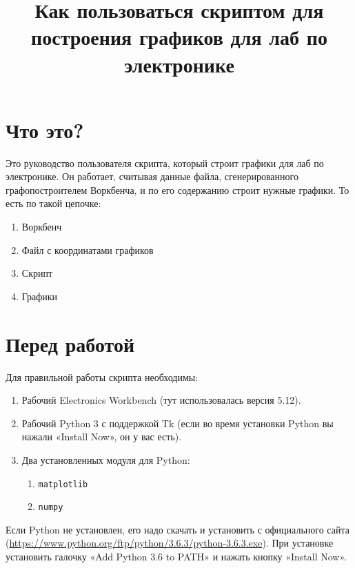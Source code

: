\documentclass[a4paper,oneside,DIV=10,12pt]{scrartcl}
\newcommand\modulename[1]{\texttt{#1}}
\begin{document}
	\lstset{
		basicstyle=\ttfamily,
		breaklines=true,
	}
	
	\title{Как пользоваться скриптом для построения графиков для лаб по электронике}
	\date{}
	\author{}
	
	\maketitle
	
	\tableofcontents
	
	\section{Что это?}
	
	Это руководство пользователя скрипта, который строит графики для лаб по электронике. Он работает, считывая данные файла, сгенерированного графопостроителем Воркбенча, и по его содержанию строит нужные графики. То есть по такой цепочке:
	\begin{enumerate}
		\item Воркбенч
		\item Файл с координатами графиков
		\item Скрипт
		\item Графики
	\end{enumerate}
	
	\section{Перед работой}
	Для правильной работы скрипта необходимы:
	\begin{enumerate}
		\item Рабочий Electronics Workbench (тут использовалась версия 5.12).
		\item Рабочий Python 3 с поддержкой Tk (если во время установки Python вы нажали «Install Now», он у вас есть).
		\item Два установленных модуля для Python:
			\begin{enumerate}
				\item \modulename{matplotlib}
				\item \modulename{numpy}
			\end{enumerate}
	\end{enumerate}
	
	Если Python не установлен, его надо скачать и установить с официального сайта (\url{https://www.python.org/ftp/python/3.6.3/python-3.6.3.exe}). При установке установить галочку «Add Python 3.6 to PATH» и нажать кнопку «Install Now».
	
\end{document}
